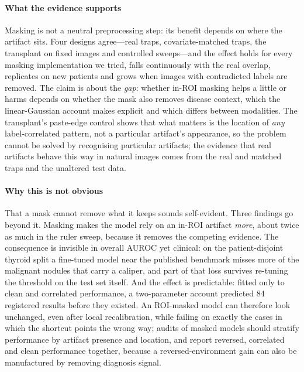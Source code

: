 \paragraph{What the evidence supports} Masking is not a neutral preprocessing step: its benefit depends on where the
artifact sits. Four designs agree---real traps, covariate-matched traps, the transplant on fixed images and controlled
sweeps---and the effect holds for every masking implementation we tried, falls continuously with the real overlap,
replicates on new patients and grows when images with contradicted labels are removed. The claim is about the
\emph{gap}: whether in-ROI masking helps a little or harms depends on whether the mask also removes disease context,
which the linear-Gaussian account makes explicit and which differs between modalities. The transplant's paste-edge
control shows that what matters is the location of \emph{any} label-correlated pattern, not a particular artifact's
appearance, so the problem cannot be solved by recognising particular artifacts; the evidence that real artifacts behave
this way in natural images comes from the real and matched traps and the unaltered test data.

\paragraph{Why this is not obvious} That a mask cannot remove what it keeps sounds self-evident. Three findings go
beyond it. Masking makes the model rely on an in-ROI artifact \emph{more}, about twice as much in the ruler sweep,
because it removes the competing evidence. The consequence is invisible in overall AUROC yet clinical: on the
patient-disjoint thyroid split a fine-tuned model near the published benchmark misses more of the malignant nodules
that carry a caliper, and part of that loss survives re-tuning the threshold on the test set itself. And the effect is
predictable: fitted only to clean and correlated performance, a two-parameter account predicted 84 registered results
before they existed. An ROI-masked model can therefore look unchanged, even after local recalibration, while failing on
exactly the cases in which the shortcut points the wrong way; audits of masked models should stratify performance by
artifact presence and location, and report reversed, correlated and clean performance together, because a
reversed-environment gain can also be manufactured by removing diagnosis signal.

